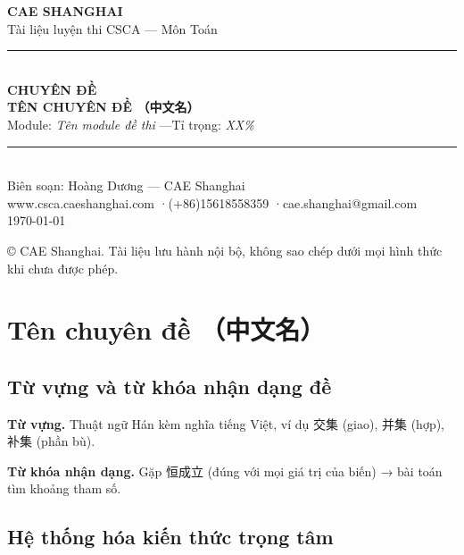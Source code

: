 \documentclass[12pt, a4paper]{report}
\newcommand{\cjk}[1]{{\cjkfont #1}}
\begin{document}
\begin{titlepage}
  \centering
  \vspace*{1.5cm}
  {\Large\bfseries\color{cae_blue} CAE SHANGHAI}\\[0.3cm]
  {\small Tài liệu luyện thi CSCA — Môn Toán}\\[2.5cm]

  {\color{cae_gold}\rule{0.5\linewidth}{0.8pt}}\\[0.8cm]
  {\Huge\bfseries\color{cae_blue} CHUYÊN ĐỀ~\thechapter}\\[0.4cm]
  {\LARGE\bfseries TÊN CHUYÊN ĐỀ \cjk{（中文名）}}\\[0.6cm]
  {\large Module: \emph{Tên module đề thi} \quad—\quad Tỉ trọng: \emph{XX\%}}\\[0.8cm]
  {\color{cae_gold}\rule{0.5\linewidth}{0.8pt}}\\[2.5cm]

  {\normalsize Biên soạn: Hoàng Dương — CAE Shanghai}\\
  {\small www.csca.caeshanghai.com \quad·\quad (+86)15618558359 \quad·\quad cae.shanghai@gmail.com}\\[0.3cm]
  {\small \today}

  \vfill
  {\footnotesize © CAE Shanghai. Tài liệu lưu hành nội bộ, không sao chép dưới mọi hình thức khi chưa được phép.}
\end{titlepage}

\tableofcontents
\clearpage

\chapter{Tên chuyên đề \cjk{（中文名）}}
\label{ch:mau}

\section{Từ vựng và từ khóa nhận dạng đề}

\textbf{Từ vựng.} Thuật ngữ Hán kèm nghĩa tiếng Việt, ví dụ \cjk{交集} (giao), \cjk{并集} (hợp), \cjk{补集} (phần bù).

\textbf{Từ khóa nhận dạng.} Gặp \cjk{恒成立} (đúng với mọi giá trị của biến) → bài toán tìm khoảng tham số.

\section{Hệ thống hóa kiến thức trọng tâm}
\end{document}
